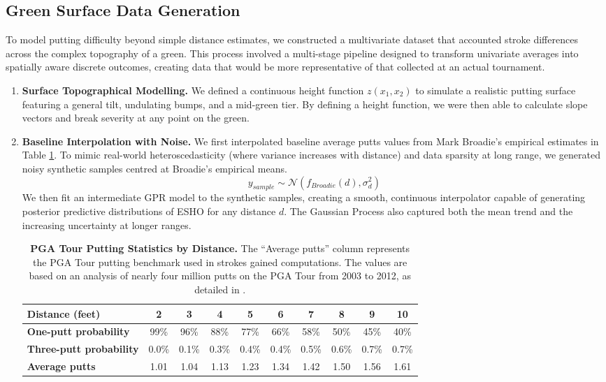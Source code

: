 \documentclass[11pt, letterpaper]{article}
\begin{document}
\subsection{Green Surface Data Generation}
\label{app: green-surface data}
To model putting difficulty beyond simple distance estimates, we constructed a multivariate dataset that accounted stroke differences across the complex topography of a green. This process involved a multi-stage pipeline designed to transform univariate averages into spatially aware discrete outcomes, creating data that would be more representative of that collected at an actual tournament.

\begin{enumerate}
    \item \textbf{Surface Topographical Modelling.} We defined a continuous height function $z(x_1, x_2)$ to simulate a realistic putting surface featuring a general tilt, undulating bumps, and a mid-green tier. By defining a height function, we were then able to calculate slope vectors and break severity at any point on the green.
    \item \textbf{Baseline Interpolation with Noise.} We first interpolated baseline average putts values from Mark Broadie's empirical estimates in Table \ref{tab: ESHO_Putts}. 
    To mimic real-world heteroscedasticity (where variance increases with distance) and data sparsity at long range, we generated noisy synthetic samples centred  at Broadie's empirical means.
\[ y_{sample} \sim \mathcal{N}(f_{Broadie}(d), \sigma_d^2) \]
We then fit an intermediate GPR model to the synthetic samples, creating a smooth, continuous interpolator capable of generating posterior predictive distributions of ESHO for any distance $d$. The Gaussian Process also captured both the mean trend and the increasing uncertainty at longer ranges.
\begin{table}[h!]
    \centering
    \scriptsize
    \caption{\textbf{PGA Tour Putting Statistics by Distance.} The ``Average putts'' column represents the PGA Tour putting benchmark used in strokes gained computations. The values are based on an analysis of nearly four million putts on the PGA Tour from 2003 to 2012, as detailed in \parencite{Broadie_2014a}.}
    \label{tab: ESHO_Putts}
    \renewcommand{\arraystretch}{1.2}
    \begin{tabular}{l|*{9}{c}}
        \toprule
        \textbf{Distance (feet)} & 2 & 3 & 4 & 5 & 6 & 7 & 8 & 9 & 10 \\
        \midrule
        \textbf{One-putt probability} & 99\% & 96\% & 88\% & 77\% & 66\% & 58\% & 50\% & 45\% & 40\% \\
        \textbf{Three-putt probability} & 0.0\% & 0.1\% & 0.3\% & 0.4\% & 0.4\% & 0.5\% & 0.6\% & 0.7\% & 0.7\% \\
        \textbf{Average putts} & 1.01 & 1.04 & 1.13 & 1.23 & 1.34 & 1.42 & 1.50 & 1.56 & 1.61 \\
        \bottomrule
    \end{tabular}
    

\end{table}
\end{enumerate}
\end{document}
